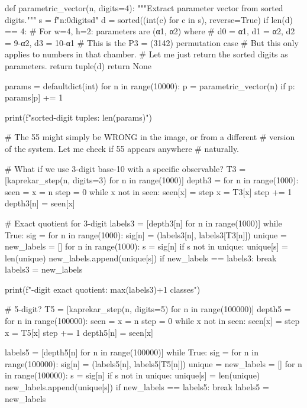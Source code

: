 {{{{{{{{{{{{{def parametric_vector(n, digits=4):
    """Extract parameter vector from sorted digits."""
    s = f"{n:0{digits}d}"
    d = sorted((int(c) for c in s), reverse=True)
    if len(d) == 4:
        # For w=4, h=2: parameters are (α1, α2) where
        # d0 = α1, d1 = α2, d2 = 9-α2, d3 = 10-α1
        # This is the P3 = (3142) permutation case
        # But this only applies to numbers in that chamber.
        # Let me just return the sorted digits as parameters.
        return tuple(d)
    return None

params = defaultdict(int)
for n in range(10000):
    p = parametric_vector(n)
    if p:
        params[p] += 1

print(f"\nDistinct sorted-digit tuples: {len(params)}")

# The 55 might simply be WRONG in the image, or from a different
# version of the system. Let me check if 55 appears anywhere
# naturally.

# What if we use 3-digit base-10 with a specific observable?
T3 = [kaprekar_step(n, digits=3) for n in range(1000)]
depth3 = {}
for n in range(1000):
    seen = {}
    x = n
    step = 0
    while x not in seen:
        seen[x] = step
        x = T3[x]
        step += 1
    depth3[n] = seen[x]

# Exact quotient for 3-digit
labels3 = [depth3[n] for n in range(1000)]
while True:
    sig = {}
    for n in range(1000):
        sig[n] = (labels3[n], labels3[T3[n]])
    unique = {}
    new_labels = []
    for n in range(1000):
        s = sig[n]
        if s not in unique:
            unique[s] = len(unique)
        new_labels.append(unique[s])
    if new_labels == labels3:
        break
    labels3 = new_labels

print(f"-digit exact quotient: {max(labels3)+1} classes")

# 5-digit?
T5 = [kaprekar_step(n, digits=5) for n in range(100000)]
depth5 = {}
for n in range(100000):
    seen = {}
    x = n
    step = 0
    while x not in seen:
        seen[x] = step
        x = T5[x]
        step += 1
    depth5[n] = seen[x]

labels5 = [depth5[n] for n in range(100000)]
while True:
    sig = {}
    for n in range(100000):
        sig[n] = (labels5[n], labels5[T5[n]])
    unique = {}
    new_labels = []
    for n in range(100000):
        s = sig[n]
        if s not in unique:
            unique[s] = len(unique)
        new_labels.append(unique[s])
    if new_labels == labels5:
        break
    labels5 = new_labels

}}}}}}}}}}}}}
